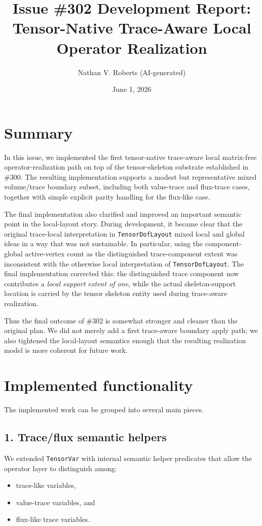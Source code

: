 \documentclass[11pt]{article}
\title{Issue \#302 Development Report: Tensor-Native Trace-Aware Local Operator Realization}
\author{Nathan V. Roberts (AI-generated)}
\date{June 1, 2026}
\begin{document}
\maketitle

\section{Summary}

In this issue, we implemented the first tensor-native trace-aware local matrix-free operator-realization path on top of the tensor-skeleton substrate established in \#300. The resulting implementation supports a modest but representative mixed volume/trace boundary subset, including both value-trace and flux-trace cases, together with simple explicit parity handling for the flux-like case.

The final implementation also clarified and improved an important semantic point in the local-layout story. During development, it became clear that the original trace-local interpretation in \texttt{TensorDofLayout} mixed local and global ideas in a way that was not sustainable. In particular, using the component-global active-vertex count as the distinguished trace-component extent was inconsistent with the otherwise local interpretation of \texttt{TensorDofLayout}. The final implementation corrected this: the distinguished trace component now contributes a \emph{local support extent of one}, while the actual skeleton-support location is carried by the tensor skeleton entity used during trace-aware realization.

Thus the final outcome of \#302 is somewhat stronger and cleaner than the original plan. We did not merely add a first trace-aware boundary apply path; we also tightened the local-layout semantics enough that the resulting realization model is more coherent for future work.

\section{Implemented functionality}

The implemented work can be grouped into several main pieces.

\subsection{1. Trace/flux semantic helpers}

We extended \texttt{TensorVar} with internal semantic helper predicates that allow the operator layer to distinguish among:
\begin{itemize}[leftmargin=*]
  \item trace-like variables,
  \item value-trace variables, and
  \item flux-like trace variables.
\end{itemize}
\end{document}
